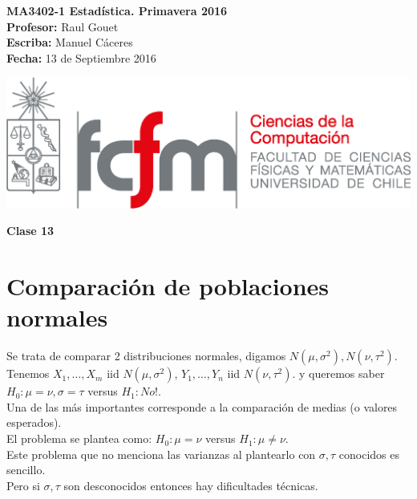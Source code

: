 \documentclass[10pt]{article}
\theoremstyle{plain}
\theoremstyle{definition}
\newcommand{\catnum}{13} %
\newcommand{\fecha}{13 de Septiembre 2016 }
\begin{document}
\vspace*{-1.2 cm}
\begin{minipage}{0.6\textwidth}
\begin{flushleft}
\hspace*{-0.5cm}\textbf{MA3402-1 Estadística. Primavera 2016}\\
\hspace*{-0.5cm}\textbf{Profesor:} Raul Gouet\\
\hspace*{-0.5cm}\textbf{Escriba:} Manuel Cáceres\\
\hspace*{-0.5cm}\textbf{Fecha:} \fecha
\end{flushleft}
\end{minipage}
\begin{minipage}{0.36\textwidth}
\begin{flushright}
\includegraphics[scale=0.3]{imagenes/fcfm_dcc}
\end{flushright}
\end{minipage}
\bigskip

\begin{center}
\LARGE\textbf{Clase \catnum}
\end{center}
\section{Comparación de poblaciones normales}
Se trata de comparar 2 distribuciones normales, digamos $N(\mu,\sigma^2), N(\nu,\tau^2)$. Tenemos $X_{1},\ldots,X_{m}$ iid $N(\mu,\sigma^2)$, $Y_{1},\ldots,Y_{n}$ iid $N(\nu,\tau^2)$. y queremos saber $H_{0}: \mu = \nu, \sigma = \tau$ versus $H_{1}: No!$.\\

Una de las más importantes corresponde a la comparación de medias (o valores esperados).\\

El problema se plantea como: $H_{0}: \mu=\nu$ versus $H_{1}:\mu \not = \nu$.\\
Este problema que no menciona las varianzas al plantearlo con $\sigma,\tau$ conocidos es sencillo.\\
Pero si $\sigma,\tau$ son desconocidos entonces hay dificultades técnicas.\\
\end{document}
